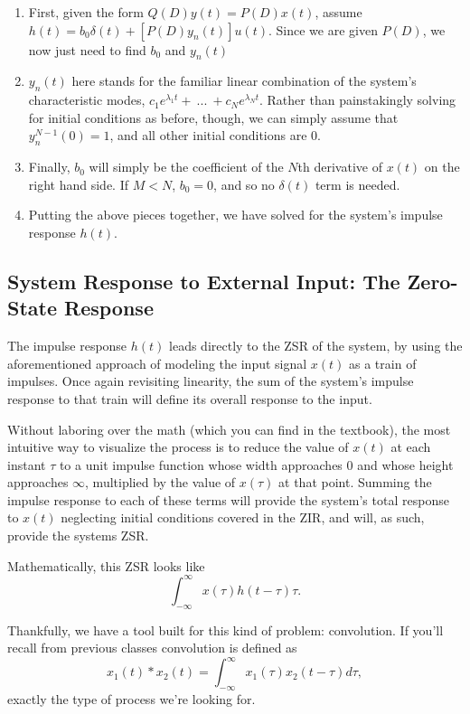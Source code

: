 \documentclass{article}
\begin{document}
\begin{enumerate}
	\item First, given the form \(Q(D)y(t) = P(D)x(t)\), assume \(h(t) = b_0\delta(t) + [P(D)y_n(t)]u(t)\). Since we are given \(P(D)\), we now just need to find \(b_0\) and \(y_n(t)\)
	\item \(y_n(t)\) here stands for the familiar linear combination of the system's characteristic modes, \(c_1e^{\lambda_1 t} + \ ... \ + c_Ne^{\lambda_N t}\). Rather than painstakingly solving for initial conditions as before, though, we can simply assume that \(y_n^{N-1}(0) = 1\), and all other initial conditions are 0.
	\item Finally, \(b_0\) will simply be the coefficient of the \(N\)th derivative of \(x(t)\) on the right hand side. If \(M < N\), \(b_0 = 0\), and so no \(\delta(t)\) term is needed.
	\item Putting the above pieces together, we have solved for the system's impulse response \(h(t)\).
\end{enumerate}

\setcounter{subsection}{3}
\subsection{System Response to External Input: The Zero-State Response}

The impulse response \(h(t)\) leads directly to the ZSR of the system, by using the aforementioned approach of modeling the input signal \(x(t)\) as a train of impulses. Once again revisiting linearity, the sum of the system's impulse response to that train will define its overall response to the input.

Without laboring over the math (which you can find in the textbook), the most intuitive way to visualize the process is to reduce the value of \(x(t)\) at each instant \(\tau\) to a unit impulse function whose width approaches \(0\) and whose height approaches \(\infty\), multiplied by the value of \(x(\tau)\) at that point. Summing the impulse response to each of these terms will provide the system's total response to \(x(t)\) neglecting initial conditions covered in the ZIR, and will, as such, provide the systems ZSR.

Mathematically, this ZSR looks like 
\[
  \int_{-\infty}^{\infty}x(\tau)h(t-\tau)\tau.
\]

Thankfully, we have a tool built for this kind of problem: convolution. If you'll recall from previous classes convolution is defined as 
\[
  x_1(t) * x_2(t) = \int_{-\infty}^{\infty}x_1(\tau)x_2(t-\tau)d\tau,
\]
exactly the type of process we're looking for.
\end{document}
